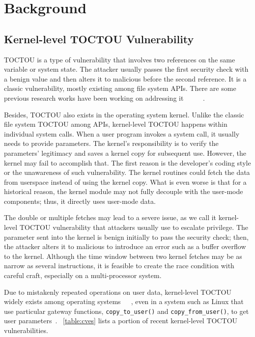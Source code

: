 
\section{Background}
\label{sec:ktoctou-background}



\subsection{Kernel-level TOCTOU Vulnerability}

TOCTOU is a type of vulnerability that involves two references on the same variable or system state. The attacker usually passes the first security check with a benign value and then alters it to malicious before the second reference. It is a classic vulnerability, mostly existing among file system APIs. There are some previous research works have been working on addressing it ~\cite{dean2004fixing}~\cite{borisov2005fixing}~\cite{bishop1996checking}~\cite{bishop1995race}~\cite{wei2005tocttou}.


Besides, TOCTOU also exists in the operating system kernel. Unlike the classic file system TOCTOU among APIs, kernel-level TOCTOU happens within individual system calls. When a user program invokes a system call, it usually needs to provide parameters. The kernel's responsibility is to verify the parameters' legitimacy and saves a kernel copy for subsequent use. However, the kernel may fail to accomplish that. The first reason is the developer's coding style or the unawareness of such vulnerability. The kernel routines could fetch the data from userspace instead of using the kernel copy. What is even worse is that for a historical reason, the kernel module may not fully decouple with the user-mode components; thus, it directly uses user-mode data.

The double or multiple fetches may lead to a severe issue, as we call it kernel-level TOCTOU vulnerability that attackers usually use to escalate privilege. The parameter sent into the kernel is benign initially to pass the security check; then, the attacker alters it to malicious to introduce an error such as a buffer overflow to the kernel. Although the time window between two kernel fetches may be as narrow as several instructions, it is feasible to create the race condition with careful craft, especially on a multi-processor system.

Due to mistakenly repeated operations on user data, kernel-level TOCTOU widely exists among operating systems~\cite{watson2007exploiting}~\cite{yang2012concurrency}~\cite{lu2008learning}, even in a system such as Linux that use particular gateway functions, \texttt{copy\_to\_user()} and \texttt{copy\_from\_user()}, to get user parameters~\cite{double-fetch-linux}. ~\autoref{table:cves} lists a portion of recent kernel-level TOCTOU vulnerabilities.

